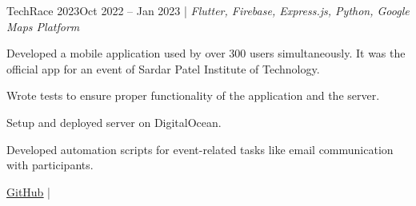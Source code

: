 \resumeSubheadings
{TechRace 2023}{Oct 2022 -- Jan 2023}
{}{}{| \textit{Flutter, Firebase, Express.js, Python, Google Maps Platform}}
\resumeItemListStart
\item Developed a mobile application used by over 300 users simultaneously. It was the official app for an event of Sardar Patel Institute of Technology.
\item Wrote tests to ensure proper functionality of the application and the server.
\item Setup and deployed server on DigitalOcean.
\item Developed automation scripts for event-related tasks like email communication with participants.
\item \href{https://github.com/DeveloperDowny/techrace_2023}{\underline{GitHub}} | \href{https://github.com/DeveloperDowny/techrace_2023?tab=readme-ov-file#annotated-screenshots-of-the-techrace-2023-app}{\underline{}}
\resumeItemListEnd